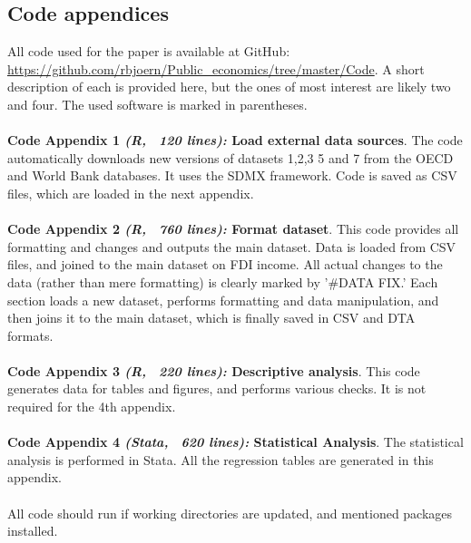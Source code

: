 \documentclass[twoside,a4paper,11pt]{article}
\begin{document}
\subsection{Code appendices}\label{AppCode}
All code used for the paper is available at GitHub:  \url{https://github.com/rbjoern/Public_economics/tree/master/Code}. A short description of each is provided here, but the ones of most interest are likely two and four. The used software is marked in parentheses. 
\\\\
\textbf{Code Appendix 1 \textit{(R, ~120 lines):} Load external data sources}. The code automatically downloads new versions of datasets 1,2,3 5 and 7 from the OECD and World Bank databases. It uses the SDMX framework. Code is saved as CSV files, which are loaded in the next appendix. 
\\\\
\textbf{Code Appendix 2 \textit{(R, ~760 lines):} Format dataset}. This code provides all formatting and changes and outputs the main dataset. Data is loaded from CSV files, and joined to the main dataset on FDI income. All actual changes to the data (rather than mere formatting) is clearly marked by '\#DATA FIX.' Each section loads a new dataset, performs formatting and data manipulation, and then joins it to the main dataset, which is finally saved in CSV and DTA formats. 
\\\\
\textbf{Code Appendix 3 \textit{(R, ~220 lines):} Descriptive analysis}. This code generates data for tables and figures, and performs various checks. It is not required for the 4th appendix.
\\\\
\textbf{Code Appendix 4 \textit{(Stata, ~620 lines):} Statistical Analysis}. The statistical analysis is performed in Stata. All the regression tables are generated in this appendix. 
\\\\ 
All code should run if working directories are updated, and mentioned packages installed. 
\end{document}

